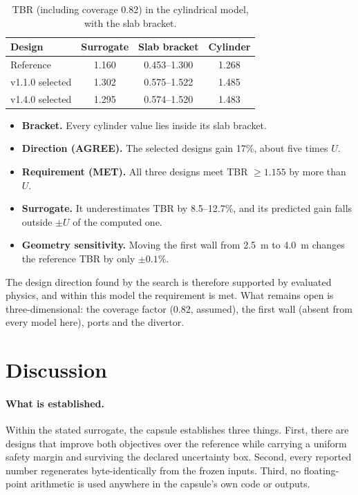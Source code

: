 \documentclass[11pt]{article}
\begin{document}
\begin{table}[h]
\centering
\caption{TBR (including coverage 0.82) in the cylindrical model, with the slab bracket.}
\label{tab:cyl}
\begin{tabular}{lccc}
\toprule
Design & Surrogate & Slab bracket & Cylinder \\
\midrule
Reference & 1.160 & 0.453--1.300 & 1.268 \\
v1.1.0 selected & 1.302 & 0.575--1.522 & 1.485 \\
v1.4.0 selected & 1.295 & 0.574--1.520 & 1.483 \\
\bottomrule
\end{tabular}
\end{table}

\begin{itemize}[leftmargin=1.2em]
  \item \textbf{Bracket.} Every cylinder value lies inside its slab bracket.
  \item \textbf{Direction (AGREE).} The selected designs gain 17\%, about five times $U$.
  \item \textbf{Requirement (MET).} All three designs meet TBR $\ge 1.155$ by more than $U$.
  \item \textbf{Surrogate.} It underestimates TBR by 8.5--12.7\%, and its predicted gain falls outside
  $\pm U$ of the computed one.
  \item \textbf{Geometry sensitivity.} Moving the first wall from 2.5~m to 4.0~m changes the reference TBR by
  only $\pm0.1\%$.
\end{itemize}

The design direction found by the search is therefore supported by evaluated physics, and within this model
the requirement is met. What remains open is three-dimensional: the coverage factor (0.82, assumed), the first
wall (absent from every model here), ports and the divertor.

\section{Discussion}

\paragraph{What is established.}
Within the stated surrogate, the capsule establishes three things. First, there are designs that
improve both objectives over the reference while carrying a uniform safety margin and surviving the
declared uncertainty box. Second, every reported number regenerates byte-identically from the frozen
inputs. Third, no floating-point arithmetic is used anywhere in the capsule's own code or outputs.
\end{document}
